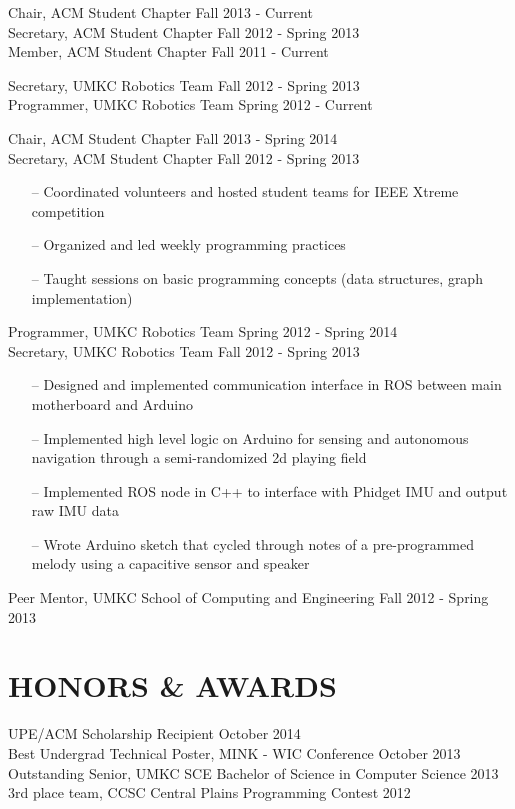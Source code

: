\documentclass[line,margin]{res}
\begin{document}
\begin{resume}
		Chair, ACM Student Chapter \hfill Fall 2013 - Current \\
		Secretary, ACM Student Chapter \hfill Fall 2012 - Spring 2013 \\	
		Member, ACM Student Chapter \hfill Fall 2011 - Current 
		
		Secretary, UMKC Robotics Team \hfill  Fall 2012 - Spring 2013 \\	
		Programmer, UMKC Robotics Team \hfill Spring 2012 - Current 
		
		Chair, ACM Student Chapter \hfill Fall 2013 - Spring 2014\\
		Secretary, ACM Student Chapter \hfill Fall 2012 - Spring 2013 
		         \begin{itemize} [leftmargin=5mm]  \itemsep -2pt %
                 \item[--] Coordinated volunteers and hosted student teams for IEEE Xtreme competition 
                 \item[--] Organized and led weekly programming practices
                 \item[--] Taught sessions on basic programming concepts (data structures, graph implementation)
                 \end{itemize} 

		
		Programmer, UMKC Robotics Team \hfill Spring 2012 - Spring 2014\\ 
		Secretary, UMKC Robotics Team \hfill  Fall 2012 - Spring 2013 	
		\begin{itemize} [leftmargin=5mm]  \itemsep -2pt %
                 \item[--] Designed and implemented communication interface in ROS between main motherboard and Arduino 
				 \item[--] Implemented high level logic on Arduino for sensing and autonomous navigation through a semi-randomized 2d playing field
                 \item[--] Implemented ROS node in C++ to interface with Phidget IMU and output raw IMU data
                 \item[--] Wrote Arduino sketch that cycled through notes of a pre-programmed melody using a capacitive sensor and speaker
                 \end{itemize} 
		
		Peer Mentor, UMKC School of Computing and Engineering \hfill Fall 2012 - Spring 2013 

\section{HONORS \& AWARDS}
		UPE/ACM Scholarship Recipient \hfill October 2014 \\
		Best Undergrad Technical Poster, MINK - WIC Conference \hfill October 2013	\\
		Outstanding Senior, UMKC SCE Bachelor of Science in Computer Science \hfill 2013 \\
		3rd place team, CCSC Central Plains Programming Contest \hfill 2012 

\end{resume}
\end{document}
